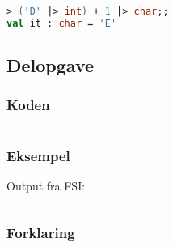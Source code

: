 \begin{lstlisting}[language=fsharp]
> ('D' |> int) + 1 |> char;;
val it : char = 'E'
\end{lstlisting}


\subsection{Delopgave }\label{ass:1-}
\subsubsection{Koden}
\begin{lstlisting}[language=fsharp]

\end{lstlisting}

\subsubsection{Eksempel}
Output fra FSI:
\begin{lstlisting}

\end{lstlisting}

\subsubsection{Forklaring}


